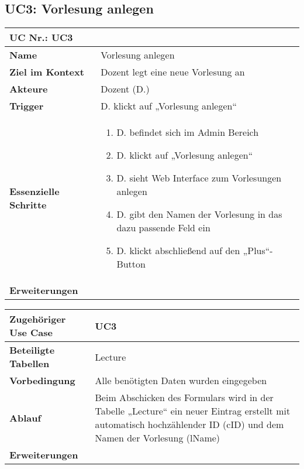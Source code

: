 \begin{table}[h]
\subsection{UC3: Vorlesung anlegen}
	\begin{tabular}{|p{3cm}|p{11.06cm}|}
	\hline
		\multicolumn{2}{|l|}{\textbf{UC Nr.: UC3} }   \\ \hline
		\textbf{Name}                 &     Vorlesung anlegen    \\ \hline
		\textbf{Ziel im Kontext}      &     Dozent legt eine neue Vorlesung an   \\ \hline
		\textbf{Akteure}              &     Dozent (D.)    \\ \hline
		\textbf{Trigger}              &     D. klickt auf „Vorlesung anlegen“    \\ \hline
		\textbf{Essenzielle Schritte} & 
			\begin{enumerate}
			  \item D. befindet sich im Admin Bereich
			  \item D. klickt auf „Vorlesung anlegen“
			  \item D. sieht Web Interface zum Vorlesungen anlegen
			  \item D. gibt den Namen der Vorlesung in das dazu passende Feld ein
			  \item D. klickt abschließend auf den „Plus“-Button
			\end{enumerate}
		\\ \hline
		\textbf{Erweiterungen} 		  &         \\ \hline
	\end{tabular}
\end{table}\FloatBarrier

\begin{table}[h]
	\begin{tabular}{|p{3cm}|p{11.06cm}|}
	\hline
		\textbf{Zugehöriger Use Case}                 &    UC3     \\ \hline
		\textbf{Beteiligte Tabellen}      &     Lecture    \\ \hline
		\textbf{Vorbedingung}              &    Alle benötigten Daten wurden eingegeben     \\ \hline
		\textbf{Ablauf}              &   Beim Abschicken des Formulars wird in der Tabelle „Lecture“ ein neuer Eintrag erstellt mit automatisch hochzählender ID (cID) und dem Namen der Vorlesung (lName) \\ \hline
		\textbf{Erweiterungen}              &         \\ \hline
	\end{tabular}
\end{table}\FloatBarrier


